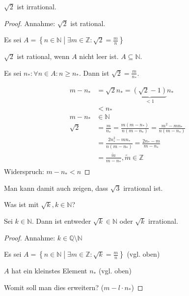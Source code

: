 \begin{example}
  $\sqrt{2}$ ist irrational.

  \begin{proof}
    Annahme: $\sqrt{2}$ ist rational.

    Es sei \( A = \left\{ n \in \mathbb{N} \middle| \exists m \in \mathbb{Z}: \sqrt{2} = \frac{m}{n} \right\} \)

    $\sqrt{2}$ ist rational, wenn $A$ nicht leer ist. $A \subseteq \mathbb{N}$.

    Es sei $n_{*}: \forall n \in A: n \ge n_{*}$. Dann ist $\sqrt{2} = \frac{m}{n_{*}}$.

    \begin{align*}
      m-n_{*} &= \sqrt{2}n_{*} = \underbrace{\left( \sqrt{2}-1 \right)}_{< 1}n_{*} \\
      \, &< n_{*} \\
      m-n_{*} &\in \mathbb{N} \\
      \sqrt{2} &= \frac{m}{n_{*}} = \frac{m(m-n_{*})}{n(m-n_{*})} = \frac{m^2-mn_{*}}{n(m-n_{*})} \\
      \, &= \frac{2n_{*}^2-mn_{*}}{n(m-n_{*})} = \frac{2n_{*}-m}{m-n_{*}} \\
      \, &= \frac{\tilde{m}}{m-n_{*}}, \tilde{m} \in \mathbb{Z} \\
    \end{align*}
    Widerspruch: $m-n_{*} < n$
  \end{proof}

  Man kann damit auch zeigen, dass $\sqrt{3}$ irrational ist.

  Was ist mit $\sqrt{k}, k \in \mathbb{N}$?
\end{example}

\begin{theorem}
  Sei $k \in \mathbb{N}$. Dann ist entweder $\sqrt{k} \in \mathbb{N}$ oder $\sqrt{k}$ irrational.
\end{theorem}
\begin{proof}
  Annahme: $k \in \mathbb{Q} \setminus \mathbb{N}$

  Es sei \( A = \left\{ n \in \mathbb{N} \middle| \exists m \in \mathbb{Z}: \sqrt{k} = \frac{m}{n} \right\} \) (vgl. oben)

  $A$ hat ein kleinstes Element $n_{*}$ (vgl. oben)

  Womit soll man dies erweitern? ($m - l \cdot n_{*}$)
\end{proof}